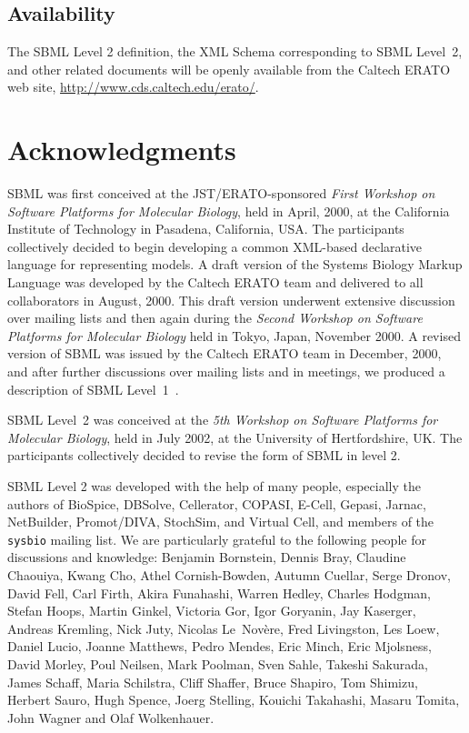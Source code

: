 \documentclass[10pt,twocolumntoc]{cekarticle}
\begin{document}
\subsection{Availability}
\label{sec:availability}

The SBML Level 2 definition, the XML Schema corresponding to SBML
Level~2, and other related documents will be openly available from the
Caltech ERATO web site, \url{http://www.cds.caltech.edu/erato/}.

\setcounter{secnumdepth}{-1}
\section{Acknowledgments}
\label{sec:acknowledgements}

SBML was first conceived at the JST/ERATO-sponsored \emph{First Workshop on
  Software Platforms for Molecular Biology}, held in April, 2000, at the
California Institute of Technology in Pasadena, California, USA.
The participants collectively decided to begin developing a common
XML-based declarative language for representing models.  A draft
version of the Systems Biology Markup Language was developed by
the Caltech ERATO team and delivered to all collaborators in
August, 2000.  This draft version underwent extensive discussion
over mailing lists and then again during the \emph{Second Workshop
on Software Platforms for Molecular Biology} held in Tokyo, Japan,
November 2000.  A revised version of SBML was issued by the
Caltech ERATO team in December, 2000, and after further
discussions over mailing lists and in meetings, we produced a
description of SBML Level~1~\citep{hucka:2001}.

SBML Level~2 was conceived at the \emph{5th Workshop on
Software Platforms for Molecular Biology}, held in July 2002, at
the University of Hertfordshire, UK.  The participants
collectively decided to revise the form of SBML in level 2.

SBML Level 2 was developed with the help of many people,
especially the authors of BioSpice, DBSolve, Cellerator, COPASI, E-Cell, Gepasi, Jarnac, NetBuilder, Promot/DIVA, StochSim, and Virtual Cell, and members of the \texttt{sysbio} mailing list.  We are particularly grateful to the following people for discussions and knowledge: Benjamin Bornstein, Dennis Bray, Claudine Chaouiya, Kwang Cho, Athel Cornish-Bowden, Autumn Cuellar, Serge Dronov, David Fell, Carl Firth, Akira Funahashi, Warren Hedley, Charles Hodgman, Stefan Hoops, Martin Ginkel, Victoria Gor, Igor Goryanin, Jay Kaserger, Andreas Kremling, Nick Juty, Nicolas Le~Nov\`{e}re, Fred Livingston, Les Loew, Daniel Lucio, Joanne Matthews, Pedro Mendes, Eric Minch, Eric Mjolsness, David Morley, Poul Neilsen, Mark Poolman, Sven Sahle, Takeshi Sakurada, James Schaff, Maria Schilstra, Cliff Shaffer, Bruce Shapiro, Tom Shimizu, Herbert Sauro, Hugh Spence, Joerg Stelling, Kouichi Takahashi, Masaru Tomita, John Wagner and Olaf Wolkenhauer.
\end{document}
